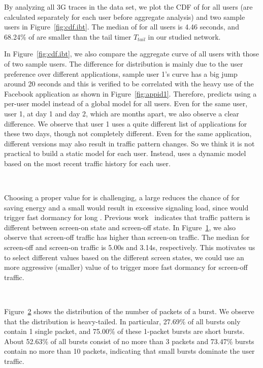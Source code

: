 By analyzing all 3G traces in the \UMICH data set, we plot the CDF of \IBTS for all users (\IBTS are calculated separately for each user before aggregate analysis) and two sample users in Figure~\ref{fig:cdf.ibt}. The median of \IBT for all users is 4.46 seconds, and 68.24\% of \IBTS are smaller than the tail timer $T_{tail}$ in our studied network.

In Figure~\ref{fig:cdf.ibt}, we also compare the aggregate curve of all users with those of two sample users. The difference for \IBT distribution is mainly due to the user preference over different applications, \eg sample user 1's curve has a big jump around 20 seconds and this is verified to be correlated with the heavy use of the Facebook application as shown in Figure~\ref{fig:appid1}. Therefore, \NAME predicts \IBT using a per-user model instead of a global model for all users. Even for the same user, \ie user 1, at day 1 and day 2, which are months apart, we also observe a clear difference. We observe that user 1 uses a quite different list of applications for these two days, though not completely different. Even for the same application, different versions may also result in traffic pattern changes. So we think it is not practical to build a static model for each user. Instead, \NAME uses a dynamic model based on the most recent traffic history for each user.


\begin{figure}[t]
\centering
{} \\
\label{fig:cdf.screen}
\end{figure}
Choosing a proper value for \SBT is challenging, \ie a large \SBT reduces the chance of \NAME for saving energy and a small \SBT would result in excessive signaling load, since \NAME would trigger fast dormancy for long \IBTS. Previous work~\cite{imc.screen} indicates that traffic pattern is different between screen-on state and screen-off state. In Figure~\ref{fig:cdf.screen}, we also observe that screen-off traffic has higher \IBTS than screen-on traffic. The median \IBT for screen-off and screen-on traffic is 5.00s and 3.14s, respectively. This motivates us to select different \SBT values based on the different screen states, \ie we could use an more aggressive (smaller) value of \SBT to trigger more fast dormancy for screen-off traffic.

\begin{figure}[t]
\centering
{} \\
\label{fig:packetNum}
\end{figure}
Figure~\ref{fig:packetNum} shows the distribution of the number of packets of a burst. We observe that the distribution is heavy-tailed. In particular, 27.69\% of all bursts only contain 1 single packet, and 75.00\% of these 1-packet bursts are short bursts. About 52.63\% of all bursts consist of no more than 3 packets and 73.47\% bursts contain no more than 10 packets, indicating that small bursts dominate the user traffic.


